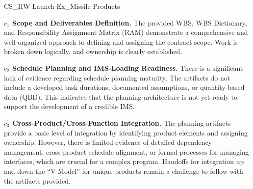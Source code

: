 %
\begin{frame}{CS\_HW Launch Ex\_Missile Products}
\begin{minipage}{0.90\textwidth}
\raggedright
\fontsize{8}{9.5}\selectfont
\textbf{\(c_1\) Scope and Deliverables Definition.}
The provided WBS, WBS Dictionary, and Responsibility Assignment Matrix (RAM) demonstrate a comprehensive and well-organized approach to defining and assigning the contract scope. Work is broken down logically, and ownership is clearly established.\par\vspace{0.6em}
\textbf{\(c_2\) Schedule Planning and IMS-Loading Readiness.}
There is a significant lack of evidence regarding schedule planning maturity. The artifacts do not include a developed task durations, documented assumptions, or quantity-based data (QBD). This indicates that the planning architecture is not yet ready to support the development of a credible IMS.\par\vspace{0.6em}
\textbf{\(c_3\) Cross-Product/Cross-Function Integration.}
The planning artifacts provide a basic level of integration by identifying product elements and assigning ownership. However, there is limited evidence of detailed dependency management, cross-product schedule alignment, or formal processes for managing interfaces, which are crucial for a complex program. Handoffs for integration up and down the “V Model” for unique products remain a challenge to follow with the artifacts provided.\par\vspace{0.6em}
\end{minipage}
\end{frame}

\endinput
